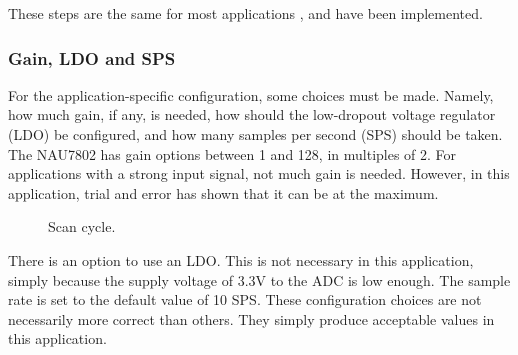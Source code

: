 \documentclass[12pt, a4paper]{article}
\begin{document}
                \noindent These steps are the same for most applications \cite{nau}, and have been implemented. 

            \subsubsection{Gain, LDO and SPS}
                
                For the application-specific configuration, some choices must be made. Namely, how much gain, if any, is needed,
                how should the low-dropout voltage regulator (LDO) be configured, and how many samples per second (SPS) should be taken.
                The NAU7802 has gain options between 1 and 128, in multiples of 2. For applications with a strong input signal,
                not much gain is needed. However, in this application, trial and error has shown that it can be at the maximum.

                \begin{figure}
                    \centering
                    \vspace{-10pt}
                    \caption{Scan cycle.}
                    \label{fig:scancycle}
                \end{figure}
                There is an option to use an LDO. This is not necessary in this application, simply because the
                supply voltage of 3.3V to the ADC is low enough. The sample rate is set to the default value of 10 SPS.
                These configuration choices are not necessarily more correct than others. They simply
                produce acceptable values in this application.
\end{document}
